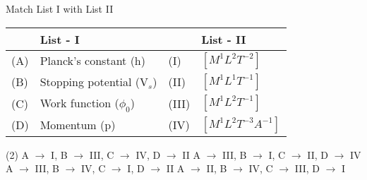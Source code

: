 \item Match List I with List II
\begin{center}
    \renewcommand{\arraystretch}{2}
    \begin{table}[h]
        \centering
        \begin{tabular}{p{0.25cm}p{8cm}|p{0.25cm}p{5cm}}
        \hline
        & \textbf{List - I} & & \textbf{List - II} \\
        \hline
        (A)& Planck’s constant (h) & (I) & $[M^1 L^2 T^{-2}]$ \\
        (B)& Stopping potential (V$_s$) & (II) & $[M^1 L^1 T^{-1}]$ \\
        (C)& Work function ($\phi_0$) & (III) & $[M^1 L^2 T^{-1}]$ \\
        (D)& Momentum (p) & (IV) & $[M^1 L^2 T^{-3} A^{-1}]$ \\
        \hline
        \end{tabular}
    \end{table}
\end{center}

\begin{tasks}(2)
    \task A $\rightarrow$ I, B $\rightarrow$ III, C $\rightarrow$ IV, D $\rightarrow$ II
    \task A $\rightarrow$ III, B $\rightarrow$ I, C $\rightarrow$ II, D $\rightarrow$ IV
    \task A $\rightarrow$ III, B $\rightarrow$ IV, C $\rightarrow$ I, D $\rightarrow$ II
    \task A $\rightarrow$ II, B $\rightarrow$ IV, C $\rightarrow$ III, D $\rightarrow$ I
\end{tasks}